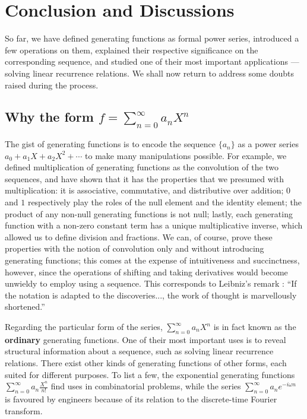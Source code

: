 \documentclass[a4paper, 12pt]{report}
\begin{document}
{\let\clearpage\relax\chapter{Conclusion and Discussions}\label{ch:conclusion}}
% 

So far, we have defined generating functions as formal power series, introduced a few operations on them, explained their respective significance on the corresponding sequence, and studied one of their most important applications --- solving linear recurrence relations. We shall now return to address some doubts raised during the process.

\section{Why the form \texorpdfstring{$f = \sum_{n = 0}^\infty a_n X^n$}}

The gist of generating functions is to encode the sequence $\{a_n\}$ as a power series $a_0 + a_1 X + a_2 X^2 + \cdots$ to make many manipulations possible. For example, we defined multiplication of generating functions as the convolution of the two sequences, and have shown that it has the properties that we presumed with multiplication: it is associative, commutative, and distributive over addition; $0$ and $1$ respectively play the roles of the null element and the identity element; the product of any non-null generating functions is not null; lastly, each generating function with a non-zero constant term has a unique multiplicative inverse, which allowed us to define division and fractions. We can, of course, prove these properties with the notion of convolution only and without introducing generating functions; this comes at the expense of intuitiveness and succinctness, however, since the operations of shifting and taking derivatives would become unwieldy to employ using a sequence. This corresponds to Leibniz's remark \autocite[1]{zorich}: ``If the notation is adapted to the discoveries..., the work of thought is marvellously shortened.'' 

Regarding the particular form of the series, $\sum_{n = 0}^\infty a_n X^n$ is in fact known as the \textbf{ordinary} generating functions. One of their most important uses is to reveal structural information about a sequence, such as solving linear recurrence relations. There exist other kinds of generating functions of other forms, each suited for different purposes. To list a few, the exponential generating functions $\sum_{n = 0}^\infty a_n \frac{X^n}{n!}$ find uses in combinatorial problems, while the series $\sum_{n = 0}^\infty a_n e^{-i\omega n}$ is favoured by engineers because of its relation to the discrete-time Fourier transform.
\end{document}
